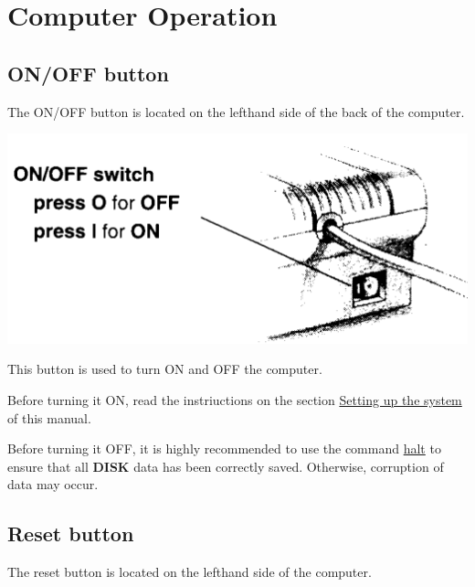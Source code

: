 \section{Computer Operation}

    \subsection{ON/OFF button}
    \label{subsec:onoffbutt}

    The ON/OFF button is located on the lefthand side of the back of the
    computer.

    \includegraphics[scale=0.5]{images/onoffbutton.png}

    This button is used to turn ON and OFF the computer.

    Before turning it ON, read the instriuctions on the section
    \hyperref[sec:setting_system]{Setting up the system} of this manual.

    Before turning it OFF, it is highly recommended to use the command 
    \hyperref[cmd:halt]{halt} to ensure that all \textbf{DISK} data has been
    correctly saved. Otherwise, corruption of data may occur.

    \subsection{Reset button}
    \label{subsec:resetbutton}

    The reset button is located on the lefthand side of the computer.

